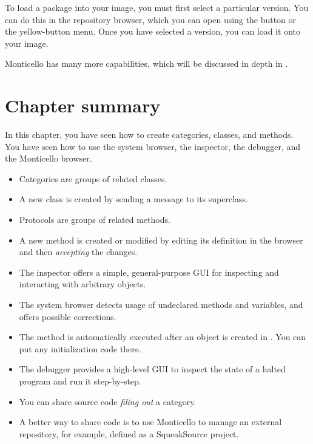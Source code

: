 \documentclass[a4paper,10pt,twoside]{book}
\begin{document}

To load a package into your image, you must first select a particular version.
You can do this in the repository browser, which you can open using the  button or the yellow-button menu.
Once you have selected a version, you can load it onto your image.


Monticello has many more capabilities, which will be discussed in depth in .

\section{Chapter summary}
In this chapter, you have seen how to create categories, classes, and methods.
You have seen how to use the system browser, the inspector, the debugger, and the Monticello browser.

\begin{itemize}
  \item Categories are groups of related classes.
  \item A new class is created by sending a message to its superclass.
  \item Protocols are groups of related methods.
  \item A new method is created or modified by editing its definition in the browser and then \emph{accepting} the changes.
  \item The inspector offers a simple, general-purpose GUI for inspecting and interacting with arbitrary objects.
  \item The system browser detects usage of undeclared methods and variables, and offers possible corrections.
  \item The  method is automatically executed after an object is created in \squeak.
  You can put any initialization code there.
  \item The debugger provides a high-level GUI to inspect the state of a halted program and run it step-by-step.
  \item You can share source code \emph{filing out} a category.
  \item A better way to share code is to use Monticello to manage an external repository, for example, defined as a SqueakSource project.
\end{itemize}

\ifx\wholebook\relax\else
\end{document}
